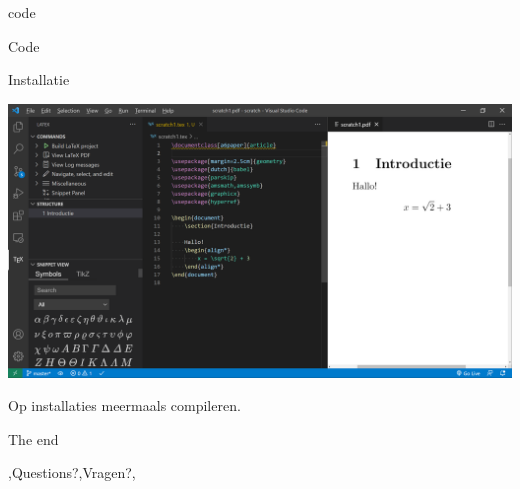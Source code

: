 \documentclass[presentatie.tex]{subfiles}
\begin{document}
\section{\texorpdfstring{}{Goed om te weten}}%

\clearrecentlist
    

\begin{saveblock}{code}
	\begin{highlightblock}[gobble=8,linewidth=0.5\textwidth,framexleftmargin=0.25em]
        Code
	\end{highlightblock}
\end{saveblock}

\begin{frame}
    {Installatie}

    \includegraphics[width=\linewidth,height=0.8\textheight,keepaspectratio]{assets/Misc/VisualStudioCodeDemo.png}
\end{frame}

\begin{frame}
    Op installaties meermaals compileren.
\end{frame}

\begin{frame}{The end}
	\begin{center}
		\LARGE \lang,Questions?,Vragen?,
	\end{center}

    \bigskip
	

    \begin{center}
    \end{center}
\end{frame}
\end{document}
